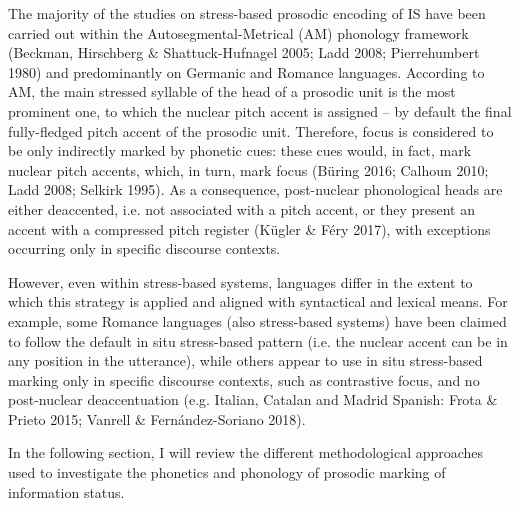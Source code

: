 \begin{styleStandard}
The majority of the studies on stress-based prosodic encoding of IS have been carried out within the Autosegmental-Metrical (AM) phonology framework (Beckman, Hirschberg \& Shattuck-Hufnagel 2005; Ladd 2008; Pierrehumbert 1980) and predominantly on Germanic and Romance languages. According to AM, the main stressed syllable of the head of a prosodic unit is the most prominent one, to which the nuclear pitch accent is assigned – by default the final fully-fledged pitch accent of the prosodic unit. Therefore, focus is considered to be only indirectly marked by phonetic cues: these cues would, in fact, mark nuclear pitch accents, which, in turn, mark focus (Büring 2016; Calhoun 2010; Ladd 2008; Selkirk 1995). As a consequence, post-nuclear phonological heads are either deaccented, i.e. not associated with a pitch accent, or they present an accent with a compressed pitch register (Kügler \& Féry 2017), with exceptions occurring only in specific discourse contexts.
\end{styleStandard}

\begin{styleStandard}
However, even within stress-based systems, languages differ in the extent to which this strategy is applied and aligned with syntactical and lexical means. For example, some Romance languages (also stress-based systems) have been claimed to follow the default in situ stress-based pattern (i.e. the nuclear accent can be in any position in the utterance), while others appear to use in situ stress-based marking only in specific discourse contexts, such as contrastive focus, and no post-nuclear deaccentuation (e.g. Italian, Catalan and Madrid Spanish: Frota \& Prieto 2015; Vanrell \& Fernández-Soriano 2018).
\end{styleStandard}

\begin{styleStandard}
In the following section, I will review the different methodological approaches used to investigate the phonetics and phonology of prosodic marking of information status. 
\end{styleStandard}

